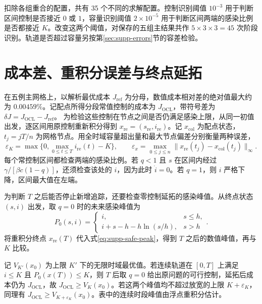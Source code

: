 \documentclass[lang=cn,a4paper,newtx]{elegantpaper}
\begin{document}
扣除各组重合的配置，共有 35 个不同的求解配置。控制识别阈值 $10^{-3}$ 用于判断区间控制是否接近 $0$ 或 $1$，容量识别阈值 $2\times10^{-5}$ 用于判断区间两端的感染比例是否都接近 $K$。改变这两个阈值，对保存的五组主结果共作 $5\times3\times3=45$ 次阶段识别。轨道是否超过容量另按第\ref{sec:supp-errors}节的容差检验。

\clearpage
\section{成本差、重积分误差与终点延拓}
\label{sec:supp-main-errors}

在五例主网格上，以解析最优成本 $J_{\mathrm{ref}}$ 为分母，数值成本相对差的绝对值最大约为 $\num{0.00459}\%$。记配点所得分段常值控制的成本为 $J_{\mathrm{OCL}}$，带符号差为 $\delta J=J_{\mathrm{OCL}}-J_{\mathrm{ref}}$。
为检验这些控制在节点之间是否仍满足感染上限，从同一初值出发，逐区间用原控制重新积分得到 $x_{\mathrm{re}}=(s_{\mathrm{re}},i_{\mathrm{re}})$。记 $x_{\mathrm{col}}$ 为配点状态，$t_j=jT/n$ 为网格节点。用全时域容量超出量和最大节点偏差分别衡量两种误差，
\begin{equation}
\varepsilon_K=\max\{0,\max_{0\le t\le T}i_{\mathrm{re}}(t)-K\},\qquad
\varepsilon_x=\max_{0\le j\le n}
\|x_{\mathrm{re}}(t_j)-x_{\mathrm{col}}(t_j)\|_\infty.
\label{eq:supp-errors}
\end{equation}
每个常控制区间都检查两端的感染比例。若 $q<1$ 且 $s$ 在区间内经过 $\gamma/[\beta c(1-q)]$，还须检查该处的 $i$，因为此时 $\dot i=0$。若 $q=1$，则 $i$ 严格下降，区间最大值在左端。

为判断 $T$ 之后能否停止新增追踪，还要检查零控制延拓的感染峰值。从终点状态 $(s,i)$ 出发，取 $q=0$ 时的未来感染峰值为
\begin{equation}
P_0(s,i)=
\begin{cases}
i,&s\le h,\\
i+s-h-h\ln(s/h),&s>h
\end{cases}.
\label{eq:supp-safe-peak}
\end{equation}
将重积分终点 $x_{\mathrm{re}}(T)$ 代入式\eqref{eq:supp-safe-peak}，得到 $T$ 之后的数值峰值，再与 $K$ 比较。

记 $V_{K'}(x_0)$ 为上限 $K'$ 下的无限时域最优值。若连续轨道在 $[0,T]$ 上满足 $i\le K$ 且 $P_0(x(T))\le K$，则 $T$ 后取 $q=0$ 给出原问题的可行控制，延拓后成本仍为 $J_{\mathrm{OCL}}$，故 $J_{\mathrm{OCL}}\ge V_K(x_0)$。若这两个峰值均不超过放宽的上限 $K+\varepsilon_K$，同理有 $J_{\mathrm{OCL}}\ge V_{K+\varepsilon_K}(x_0)$。表中的连续时段峰值由浮点重积分估计。
\end{document}
